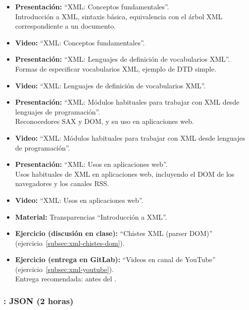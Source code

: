 \documentclass[a4paper,12pt]{article}
\begin{document}
\begin{itemize}
\item \textbf{Presentación:} ``XML: Conceptos fundamentales''. \\
  Introducción a XML, sintaxis básica, equivalencia con el árbol XML correspondiente a un documento.
\item \textbf{Video:} ``XML: Conceptos fundamentales''.

\item \textbf{Presentación:} ``XML: Lenguajes de definición de vocabularios XML''. \\
  Formas de especificar vocabularios XML, ejemplo de DTD simple.
\item \textbf{Video:} ``XML: Lenguajes de definición de vocabularios XML''.
\item \textbf{Presentación:} ``XML: Módulos habituales para trabajar con XML desde lenguajes de programación''. \\
  Reconocedores SAX y DOM, y su uso en aplicaciones web.
\item \textbf{Video:} ``XML: Módulos habituales para trabajar con XML desde lenguajes de programación''.
\item \textbf{Presentación:} ``XML: Usos en aplicaciones web''. \\
  Usos habituales de XML en aplicaciones web, incluyendo el DOM de los navegadores y los canales RSS.
\item \textbf{Video:} ``XML: Usos en aplicaciones web''.
\item \textbf{Material:} Transparencias ``Introducción a XML''.
\item \textbf{Ejercicio (discusión en clase):} ``Chistes XML (parser DOM)'' (ejercicio~\ref{subsec:xml-chistes-dom}).
\item \textbf{Ejercicio (entrega en GitLab):} ``Videos en canal de YouTube'' (ejercicio~\ref{subsec:xml-youtube}).\\
  Entrega recomendada: antes del \martesJ.
\end{itemize}

\subsubsection{\martesJ: JSON (2 horas)}
\label{cal:martesJ}
\end{document}
